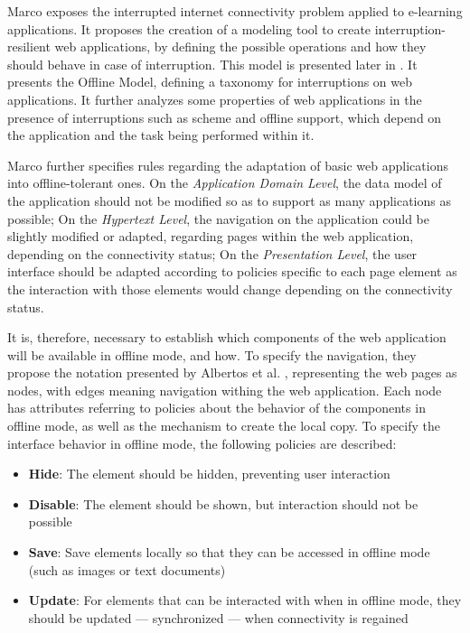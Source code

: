 Marco \cite{Marco2013} exposes the interrupted internet connectivity problem applied to e-learning applications. It proposes the creation of a modeling tool to create interruption-resilient web applications, by defining the possible operations and how they should behave in case of interruption. This model is presented later in \cite{Abertos-Marco2017}. It presents the Offline Model, defining a taxonomy for interruptions on web applications. It further analyzes some properties of web applications in the presence of interruptions such as scheme and offline support, which depend on the application and the task being performed within it.

Marco \cite{Marco2015} further specifies rules regarding the adaptation of basic web applications into offline-tolerant ones. On the \textit{Application Domain Level}, the data model of the application should not be modified so as to support as many applications as possible; On the \textit{Hypertext Level}, the navigation on the application could be slightly modified or adapted, regarding pages within the web application, depending on the connectivity status; On the \textit{Presentation Level}, the user interface should be adapted according to policies specific to each page element as the interaction with those elements would change depending on the connectivity status.

It is, therefore, necessary to establish which components of the web application will be available in offline mode, and how.
To specify the navigation, they propose the notation presented by Albertos et al. \cite{Penichet2013}, representing the web pages as nodes, with edges meaning navigation withing the web application. Each node has attributes referring to policies about the behavior of the components in offline mode, as well as the mechanism to create the local copy. To specify the interface behavior in offline mode, the following policies are described:

\begin{itemize}
    \item \textbf{Hide}: The element should be hidden, preventing user interaction
    \item \textbf{Disable}: The element should be shown, but interaction should not be possible
    \item \textbf{Save}: Save elements locally so that they can be accessed in offline mode (such as images or text documents)
    \item \textbf{Update}: For elements that can be interacted with when in offline mode, they should be updated --- synchronized --- when connectivity is regained
\end{itemize}

